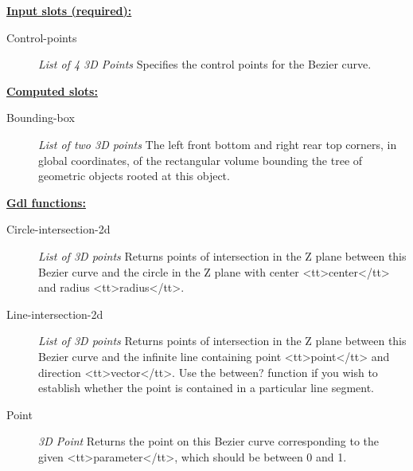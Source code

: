 \documentclass [11pt]{book}
\begin{document}
\begin{itemize}
\begin{figure}
\label{fig:BEZIER-CURVE}

\end{figure}





\textbf{
\underline{Input slots (required):}}

\begin{description}

\item [Control-points]
\emph{List of 4 3D Points} Specifies the control points for the Bezier curve.


\end{description}






\textbf{
\underline{Computed slots:}}

\begin{description}

\item [Bounding-box]
\emph{List of two 3D points} The left front bottom and right rear top corners, in global coordinates,
of the rectangular volume bounding the tree of geometric objects rooted at this object.


\end{description}






\textbf{
\underline{Gdl functions:}}

\begin{description}

\item [Circle-intersection-2d]
\emph{List of 3D points} Returns points of intersection in the Z plane between this Bezier curve and
the circle in the Z plane with center <tt>center</tt> and radius <tt>radius</tt>.


\item [Line-intersection-2d]
\emph{List of 3D points} Returns points of intersection in the Z plane between this Bezier curve
and the infinite line containing point <tt>point</tt> and direction <tt>vector</tt>. Use the
between? function if you wish to establish whether the point is contained in a particular line
segment.


\item [Point]
\emph{3D Point} Returns the point on this Bezier curve corresponding to the given <tt>parameter</tt>,
which should be between 0 and 1.



\end{description}
\end{itemize}
\end{document}
